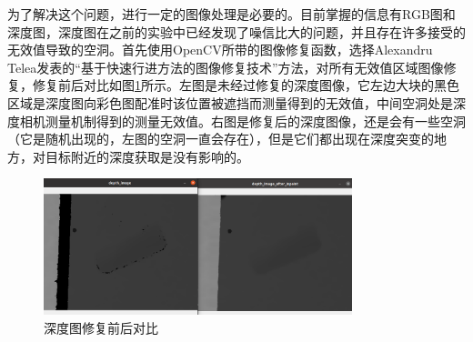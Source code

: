 \documentclass[fontset=fandol,type=bachelor,campus=harbin]{hithesisbook}
\begin{document}
为了解决这个问题，进行一定的图像处理是必要的。目前掌握的信息有RGB图和深度图，深度图在之前的实验中已经发现了噪信比大的问题，并且存在许多接受的无效值导致的空洞。首先使用OpenCV所带的图像修复函数，选择Alexandru Telea发表的“基于快速行进方法的图像修复技术”方法\cite{telea2004image}，对所有无效值区域图像修复，修复前后对比如图\ref{深度图修复前后对比}所示。左图是未经过修复的深度图像，它左边大块的黑色区域是深度图向彩色图配准时该位置被遮挡而测量得到的无效值，中间空洞处是深度相机测量机制得到的测量无效值。右图是修复后的深度图像，还是会有一些空洞（它是随机出现的，左图的空洞一直会存在），但是它们都出现在深度突变的地方，对目标附近的深度获取是没有影响的。
\begin{figure}[h]
\centering
\includegraphics[width = 0.8\textwidth]{chapter4/深度图修复前后对比}
\caption{深度图修复前后对比}
\label{深度图修复前后对比}
\end{figure}
\end{document}
